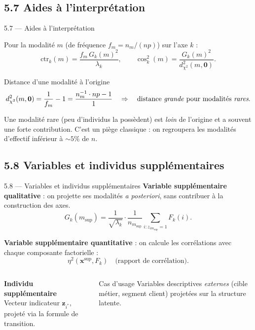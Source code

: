 \subsection{5.7 Aides à l'interprétation}
\begin{frame}{5.7 — Aides à l'interprétation}
\begin{definition}
Pour la modalité $m$ (de fréquence $f_m = n_m/(np)$) sur l'axe $k$ :
\[
\text{ctr}_k(m) = \frac{f_m\, G_k(m)^2}{\lambda_k},
\qquad
\cos^2_k(m) = \frac{G_k(m)^2}{d_{\chi^2}^2(m, \mathbf{0})}.
\]
\end{definition}

\begin{block}{Distance d'une modalité à l'origine}
\[
d_{\chi^2}^2(m, \mathbf{0}) = \frac{1}{f_m} - 1 = \frac{n_m^{-1} \cdot np - 1}{1}
\quad\Rightarrow\quad
\text{distance \emph{grande} pour modalités \emph{rares}.}
\]
\end{block}

\begin{rema}
\small Une modalité rare (peu d'individus la possèdent) est \emph{loin} de l'origine
et a souvent une forte contribution. C'est un piège classique : on regroupera
les modalités d'effectif inférieur à $\sim 5\%$ de $n$.
\end{rema}
\end{frame}

\subsection{5.8 Variables et individus supplémentaires}
\begin{frame}{5.8 — Variables et individus supplémentaires}
\textbf{Variable supplémentaire qualitative} : on projette ses modalités
\emph{a posteriori}, sans contribuer à la construction des axes.
\[
G_k(m_{\text{sup}}) = \frac{1}{\sqrt{\lambda_k}}
                     \cdot \frac{1}{n_{m_{\text{sup}}}}
                     \sum_{i : z_{im_{\text{sup}}}=1} F_k(i).
\]

\textbf{Variable supplémentaire quantitative} : on calcule les corrélations
avec chaque composante factorielle :
\[
\eta^2(\mathbf{x}^{\text{sup}}, F_k)
\quad\text{(rapport de corrélation)}.
\]

\begin{columns}[T]
\textbf{Individu supplémentaire}\\[0.1cm]
\small Vecteur indicateur $\mathbf{z}_{i^*}$, projeté via la formule de transition.

\begin{block}{Cas d'usage}
\small Variables descriptives \emph{externes} (cible métier, segment client)
projetées sur la structure latente.
\end{block}
\end{columns}
\end{frame}


